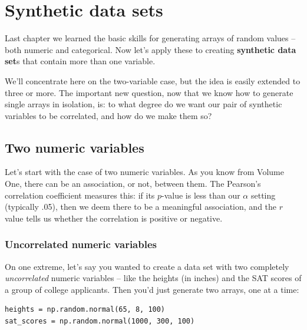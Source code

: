 \chapter{Synthetic data sets}
\label{ch:synthetic}


Last chapter we learned the basic skills for generating arrays of random values
-- both numeric and categorical. Now let's apply these to creating
\textbf{synthetic data set}s that contain more than one variable.

We'll concentrate here on the two-variable case, but the idea is easily
extended to three or more. The important new question, now that we know how to
generate single arrays in isolation, is: to what degree do we want our pair
of synthetic variables to be correlated, and how do we make them so?

\section{Two numeric variables}


Let's start with the case of two numeric variables. As you know from Volume
One, there can be an association, or not, between them. The Pearson's
correlation coefficient measures this: if its $p$-value is less than our
$\alpha$ setting (typically .05), then we deem there to be a meaningful
association, and the $r$ value tells us whether the correlation is positive or
negative.

\subsection{Uncorrelated numeric variables}

On one extreme, let's say you wanted to create a data set with two completely
\textit{uncorrelated} numeric variables -- like the heights (in inches) and the
SAT scores of a group of college applicants. Then you'd just generate two
arrays, one at a time:


\begin{Verbatim}[fontsize=\small,samepage=true,frame=single,framesep=3mm]
heights = np.random.normal(65, 8, 100)
sat_scores = np.random.normal(1000, 300, 100)
\end{Verbatim}

